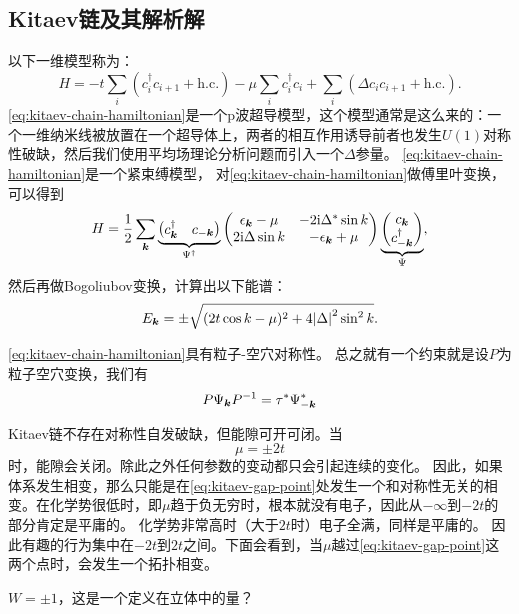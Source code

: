 \subsection{Kitaev链及其解析解}

以下一维模型称为：
\begin{equation}
    {H} = - t \sum_{i} ({c}_{i}^\dagger {c}_{i+1} + \text{h.c.}) - \mu \sum_{i} {c}_{i}^\dagger {c}_{i} + \sum_{i} (\Delta {c}_{i} {c}_{i+1} + \text{h.c.} ).
    \label{eq:kitaev-chain-hamiltonian}
\end{equation}
\eqref{eq:kitaev-chain-hamiltonian}是一个p波超导模型，这个模型通常是这么来的：一个一维纳米线被放置在一个超导体上，两者的相互作用诱导前者也发生$U(1)$对称性破缺，然后我们使用平均场理论分析问题而引入一个$\Delta$参量。
\eqref{eq:kitaev-chain-hamiltonian}是一个紧束缚模型，
对\eqref{eq:kitaev-chain-hamiltonian}做傅里叶变换，可以得到
\begin{equation}
    {H} = \frac{1}{2} \sum_{\vb*{k}} \underbrace{\pmqty{{c}^\dagger_{\vb*{k}} & {c}_{-\vb*{k}}}}_{{\Psi}^\dagger} \pmqty{\epsilon_{\vb*{k}} - \mu & -2 \ii \Delta^* \sin k \\ 2 \ii \Delta \sin k & - \epsilon_{\vb*{k}} + \mu} \underbrace{\pmqty{{c}_{\vb*{k}} \\ {c}^\dagger_{-\vb*{k}}}}_{{\Psi}},
\end{equation}
然后再做Bogoliubov变换，计算出以下能谱：
\begin{equation}
    E_{\vb*{k}} = \pm \sqrt{(2t \cos k - \mu)^2 + 4 \abs{\Delta}^2 \sin^2 k}.
\end{equation}

\eqref{eq:kitaev-chain-hamiltonian}具有粒子-空穴对称性。%
总之就有一个约束就是设$P$为粒子空穴变换，我们有
\[
    P {\Psi}_{\vb*{k}} P^{-1} = \tau^* {\Psi}_{-\vb*{k}}^*
\]

Kitaev链不存在对称性自发破缺，但能隙可开可闭。当
\begin{equation}
    \mu = \pm 2t
    \label{eq:kitaev-gap-point}
\end{equation}
时，能隙会关闭。除此之外任何参数的变动都只会引起连续的变化。
因此，如果体系发生相变，那么只能是在\eqref{eq:kitaev-gap-point}处发生一个和对称性无关的相变。在化学势很低时，即$\mu$趋于负无穷时，根本就没有电子，因此从$-\infty$到$-2t$的部分肯定是平庸的。
化学势非常高时（大于$2t$时）电子全满，同样是平庸的。
因此有趣的行为集中在$-2t$到$2t$之间。下面会看到，当$\mu$越过\eqref{eq:kitaev-gap-point}这两个点时，会发生一个拓扑相变。

$W = \pm 1$，这是一个定义在立体中的量？

